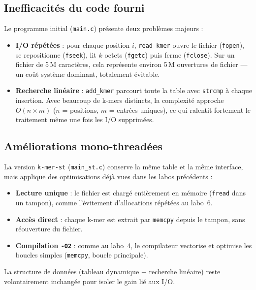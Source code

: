 \documentclass[a4paper,12pt]{article}
\begin{document}
\subsection{Inefficacités du code fourni}

Le programme initial (\texttt{main.c}) présente deux problèmes majeurs :

\begin{itemize}
    \item \textbf{I/O répétées} : pour chaque position $i$, \texttt{read\_kmer} ouvre le fichier (\texttt{fopen}), se repositionne (\texttt{fseek}), lit $k$ octets (\texttt{fgetc}) puis ferme (\texttt{fclose}). Sur un fichier de 5\,M caractères, cela représente environ 5\,M ouvertures de fichier --- un coût système dominant, totalement évitable.
    \item \textbf{Recherche linéaire} : \texttt{add\_kmer} parcourt toute la table avec \texttt{strcmp} à chaque insertion. Avec beaucoup de k-mers distincts, la complexité approche $O(n \times m)$ ($n$ = positions, $m$ = entrées uniques), ce qui ralentit fortement le traitement même une fois les I/O supprimées.
\end{itemize}

\subsection{Améliorations mono-threadées}

La version \texttt{k-mer-st} (\texttt{main\_st.c}) conserve la même table et la même interface, mais applique des optimisations déjà vues dans les labos précédents :

\begin{itemize}
    \item \textbf{Lecture unique} : le fichier est chargé entièrement en mémoire (\texttt{fread} dans un tampon), comme l'évitement d'allocations répétées au labo~6.
    \item \textbf{Accès direct} : chaque k-mer est extrait par \texttt{memcpy} depuis le tampon, sans réouverture du fichier.
    \item \textbf{Compilation \texttt{-O2}} : comme au labo~4, le compilateur vectorise et optimise les boucles simples (\texttt{memcpy}, boucle principale).
\end{itemize}

La structure de données (tableau dynamique + recherche linéaire) reste volontairement inchangée pour isoler le gain lié aux I/O.

\newpage
\end{document}
